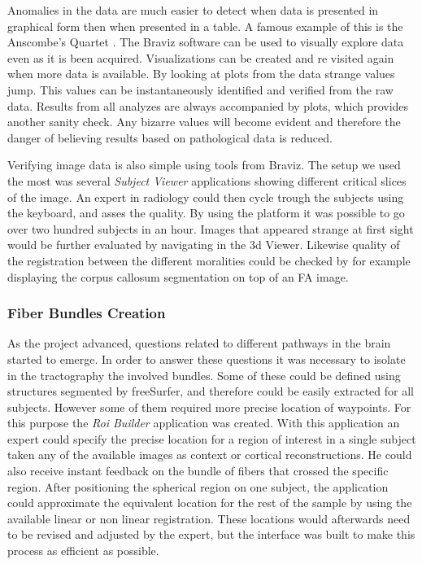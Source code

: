 Anomalies in the data are much easier to detect when data is presented in graphical form then when presented in a table. A famous example of this is the Anscombe's Quartet \autocite{anscombe_graphs_1973}. The Braviz software can be used to visually explore data even as it is been acquired. Visualizations can be created and re visited again when more data is available. By looking at plots from the data strange values jump. This values can be instantaneously identified and verified from the raw data. Results from all analyzes are always accompanied by plots, which provides another sanity check. Any bizarre values will become evident and therefore the danger of believing results based on pathological data is reduced.

Verifying image data is also simple using tools from Braviz. The setup we used the most was several \emph{Subject Viewer} applications showing different critical slices of the image. An expert in radiology could then cycle trough the subjects using the keyboard, and asses the quality. By using the platform it was possible to go over two hundred subjects in an hour. Images that appeared strange at first sight would be further evaluated by navigating in the 3d Viewer. Likewise quality of the registration between the different moralities could be checked by for example displaying the corpus callosum segmentation on top of an FA image. 

\subsubsection{Fiber Bundles Creation}

As the project advanced, questions related to different pathways in the brain started to emerge. In order to answer these questions it was necessary to isolate in the tractography the involved bundles. Some of these could be defined using structures segmented by freeSurfer, and therefore could be easily extracted for all subjects. However some of them required more precise location of waypoints. For this purpose the \emph{Roi Builder} application was created. With this application an expert could specify the precise location for a region of interest in a single subject taken any of the available images as context or cortical reconstructions. He could also receive instant feedback on the bundle of fibers that crossed the specific region. After positioning the spherical region on one subject, the application could approximate the equivalent location for the rest of the sample by using the available linear or non linear registration. These locations would afterwards need to be revised and adjusted by the expert, but the interface was built to make this process as efficient as possible.

